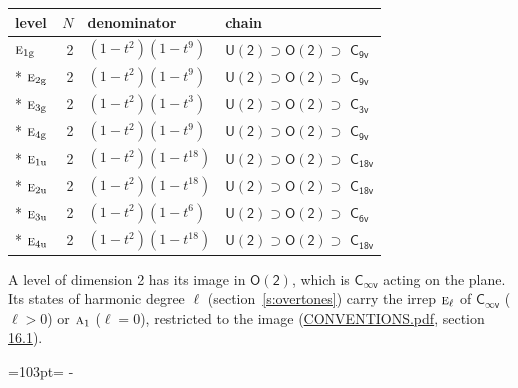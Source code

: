 \documentclass[10pt,a4paper]{article}
\newcommand{\needspace}[1]{\par\penalty-100\begingroup\dimen0=#1\relax\dimen2=\pagegoal
  \advance\dimen2-\pagetotal\ifdim\dimen0>\dimen2\relax\ifdim\dimen2>0pt\vfil\break\fi\fi
  \endgroup}
\numberwithin{equation}{section}
\newcommand{\grp}[1]{\mathsf{#1}}
\newcommand{\irr}[1]{\text{\normalfont\scshape #1}}
\newcommand{\ptag}[1]{\mathrm{#1}}
\begin{document}
{\small\begin{longtable}{@{}lrll@{}}\toprule
level & $N$ & denominator & chain\\\midrule\endhead
\bottomrule\endfoot\endlastfoot
$\irr{e}_{1\ptag{g}}$ & 2 & $(1-t^{2})(1-t^{9})$ & $\grp{U(2)} \supset \grp{O(2)} \supset$ \href{C9v.pdf}{$\grp{C_{9v}}$}\\*
$\irr{e}_{2\ptag{g}}$ & 2 & $(1-t^{2})(1-t^{9})$ & $\grp{U(2)} \supset \grp{O(2)} \supset$ \href{C9v.pdf}{$\grp{C_{9v}}$}\\*
$\irr{e}_{3\ptag{g}}$ & 2 & $(1-t^{2})(1-t^{3})$ & $\grp{U(2)} \supset \grp{O(2)} \supset$ \href{C3v.pdf}{$\grp{C_{3v}}$}\\*
$\irr{e}_{4\ptag{g}}$ & 2 & $(1-t^{2})(1-t^{9})$ & $\grp{U(2)} \supset \grp{O(2)} \supset$ \href{C9v.pdf}{$\grp{C_{9v}}$}\\*
$\irr{e}_{1\ptag{u}}$ & 2 & $(1-t^{2})(1-t^{18})$ & $\grp{U(2)} \supset \grp{O(2)} \supset$ $\grp{C_{18v}}$\\*
$\irr{e}_{2\ptag{u}}$ & 2 & $(1-t^{2})(1-t^{18})$ & $\grp{U(2)} \supset \grp{O(2)} \supset$ $\grp{C_{18v}}$\\*
$\irr{e}_{3\ptag{u}}$ & 2 & $(1-t^{2})(1-t^{6})$ & $\grp{U(2)} \supset \grp{O(2)} \supset$ \href{C6v.pdf}{$\grp{C_{6v}}$}\\*
$\irr{e}_{4\ptag{u}}$ & 2 & $(1-t^{2})(1-t^{18})$ & $\grp{U(2)} \supset \grp{O(2)} \supset$ $\grp{C_{18v}}$\\
\bottomrule\end{longtable}}
A level of dimension 2 has its image in $\grp{O(2)}$, which is \href{Cinfv.pdf}{$\grp{C_{\infty v}}$} acting on the plane. \label{n:index.harmonic.degree}Its states of harmonic degree $\ell$ (section~\ref{s:overtones}) carry the irrep $\irr{e}_{\ell}$ of \href{Cinfv.pdf}{$\grp{C_{\infty v}}$} ($\ell > 0$) or $\irr{a}_{1}$ ($\ell = 0$), restricted to the image (\href{../../CONVENTIONS.pdf}{CONVENTIONS.pdf}, section \href{../../CONVENTIONS.pdf\#conv.16.1}{16.1}).
\needspace{103pt}
\end{document}
